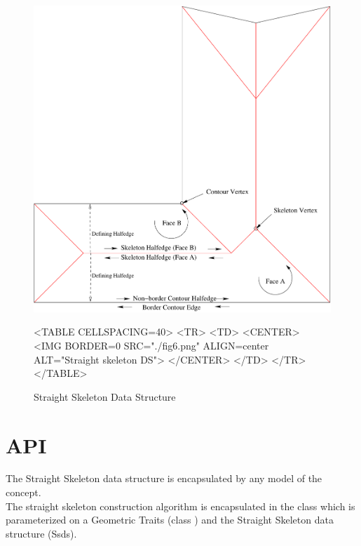 \begin{figure}[htbp]
\begin{ccTexOnly}
\begin{center}
\includegraphics{Straight_skeleton_2/fig6} %
\end{center}
\end{ccTexOnly}
\caption{Straight Skeleton Data Structure
\label{Simplepoly-offsets}}
\begin{ccHtmlOnly}
<TABLE CELLSPACING=40>
<TR>
<TD>
<CENTER>
<IMG BORDER=0 SRC="./fig6.png" ALIGN=center ALT="Straight skeleton DS">
</CENTER>
</TD>
</TR>
</TABLE>
\end{ccHtmlOnly}
\end{figure}

\section{API}

The Straight Skeleton data structure is encapsulated by any model of the  concept.\\
The straight skeleton construction algorithm is encapsulated in the class  which is parameterized on a Geometric Traits (class ) and the Straight Skeleton data structure (Ssds).

